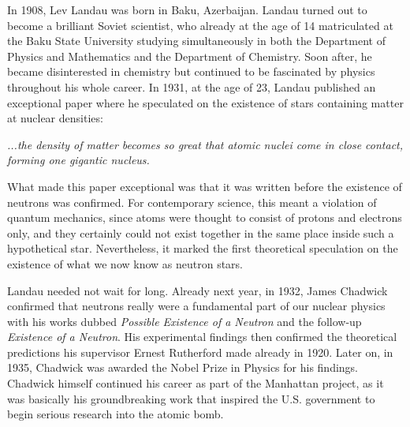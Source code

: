 In 1908, Lev Landau was born in Baku, Azerbaijan.
Landau turned out to become a brilliant Soviet scientist, who already at the age of 14 matriculated at the Baku State University studying simultaneously in both the Department of Physics and Mathematics and the Department of Chemistry.
Soon after, he became disinterested in chemistry but continued to be fascinated by physics throughout his whole career.
In 1931, at the age of 23, Landau published an exceptional paper where he speculated on the existence of stars containing matter at nuclear densities:\cite{Landau32}
\begin{displayquote}
    \textit{...the density of matter becomes so great that atomic nuclei come in close contact, forming one gigantic nucleus.}
\end{displayquote}
What made this paper exceptional was that it was written before the existence of neutrons was confirmed. 
For contemporary science, this meant a violation of quantum mechanics, since atoms were thought to consist of protons and electrons only, and they certainly could not exist together in the same place inside such a hypothetical star.
Nevertheless, it marked the first theoretical speculation on the existence of what we now know as neutron stars.

Landau needed not wait for long.
Already next year, in 1932, James Chadwick confirmed that neutrons really were a fundamental part of our nuclear physics with his works dubbed \textit{Possible Existence of a Neutron}\cite{Chadwick32a} and the follow-up \textit{Existence of a Neutron}\cite{Chadwick32b}.
His experimental findings then confirmed the theoretical predictions his supervisor Ernest Rutherford made already in 1920\cite{Rutherford20}.
Later on,  in 1935, Chadwick was awarded the Nobel Prize in Physics for his findings.
Chadwick himself continued his career as part of the Manhattan project, as it was basically his groundbreaking work that inspired the U.S. government to begin serious research into the atomic bomb.



